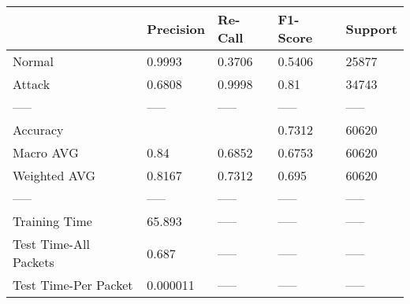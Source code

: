 \begin{tabular}{lllll}
\toprule
{} & Precision & Re-Call & F1-Score & Support \\
\midrule
Normal                &    0.9993 &  0.3706 &   0.5406 &   25877 \\
Attack                &    0.6808 &  0.9998 &     0.81 &   34743 \\
-----                 &     ----- &   ----- &    ----- &   ----- \\
Accuracy              &           &         &   0.7312 &   60620 \\
Macro AVG             &      0.84 &  0.6852 &   0.6753 &   60620 \\
Weighted AVG          &    0.8167 &  0.7312 &    0.695 &   60620 \\
-----                 &     ----- &   ----- &    ----- &   ----- \\
Training Time         &    65.893 &   ----- &    ----- &   ----- \\
Test Time-All Packets &     0.687 &   ----- &    ----- &   ----- \\
Test Time-Per Packet  &  0.000011 &   ----- &    ----- &   ----- \\
\bottomrule
\end{tabular}
